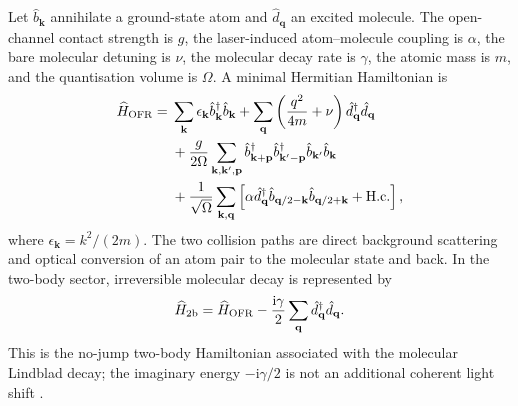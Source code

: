 \documentclass[9pt,a4paper,twocolumn,twoside]{rho-class/rho}
\newcommand{\ii}{\mathrm{i}}
\begin{document}
        Let $\hat b_{\mathbf k}$ annihilate a ground-state atom and
        $\hat d_{\mathbf q}$ an excited molecule.  The open-channel contact
        strength is $g$, the laser-induced atom--molecule coupling is $\alpha$,
        the bare molecular detuning is $\nu$, the molecular decay rate is
        $\gamma$, the atomic mass is $m$, and the quantisation volume is
        $\Omega$.  A minimal Hermitian Hamiltonian is
        \begin{align}
            \widehat H_{\rm OFR}={}&
            \sum_{\mathbf k}\epsilon_{\mathbf k}
                \hat b^\dagger_{\mathbf k}\hat b_{\mathbf k}
            +\sum_{\mathbf q}\left(\frac{q^2}{4m}+\nu\right)
                \hat d^\dagger_{\mathbf q}\hat d_{\mathbf q}\nonumber\\
            &+\frac{g}{2\Omega}
            \sum_{\mathbf k,\mathbf k',\mathbf p}
                \hat b^\dagger_{\mathbf k+\mathbf p}
                \hat b^\dagger_{\mathbf k'-\mathbf p}
                \hat b_{\mathbf k'}\hat b_{\mathbf k}\nonumber\\
            &+\frac{1}{\sqrt{\Omega}}
            \sum_{\mathbf k,\mathbf q}\left[
                \alpha\hat d^\dagger_{\mathbf q}
                \hat b_{\mathbf q/2-\mathbf k}
                \hat b_{\mathbf q/2+\mathbf k}+\mathrm{H.c.}
            \right],
            \label{eq:appendix-ofr-hamiltonian}
        \end{align}
        where $\epsilon_{\mathbf k}=k^2/(2m)$.  The two collision paths are
        direct background scattering and optical conversion of an atom pair to
        the molecular state and back.  In the two-body sector, irreversible
        molecular decay is represented by
        \begin{equation}
            \widehat H_{\rm 2b}=\widehat H_{\rm OFR}
            -\frac{\ii\gamma}{2}\sum_{\mathbf q}
                \hat d^\dagger_{\mathbf q}\hat d_{\mathbf q}.
            \label{eq:appendix-nonhermitian-hamiltonian}
        \end{equation}
        This is the no-jump two-body Hamiltonian associated with the molecular
        Lindblad decay; the imaginary energy $-\ii\gamma/2$ is not an additional
        coherent light shift \cite{liu2024weakly}.
\end{document}

